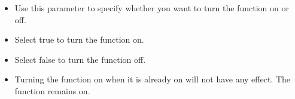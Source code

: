 % 
\begin{itemize}
\item Use this parameter to specify whether you want to turn the function on or off.
\item Select true to turn the function on.
\item Select false to turn the function off.
\item Turning the function on when it is already on will not have any effect. The function remains on.
\end{itemize}
